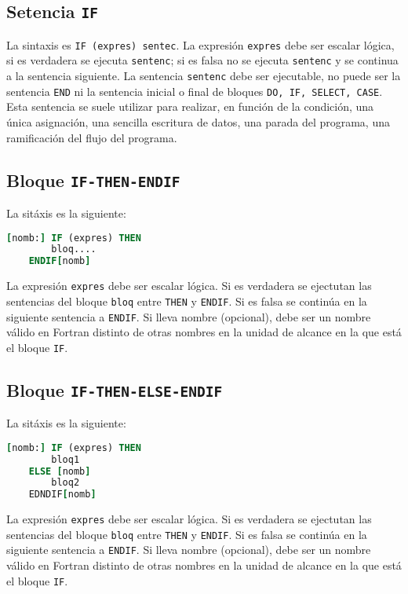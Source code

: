 \subsection{Setencia {\tt IF}}

La sintaxis es {\tt IF (expres) sentec}. La expresión {\tt expres} debe ser escalar lógica, si es verdadera se ejecuta {\tt sentenc}; si es falsa no se ejecuta {\tt sentenc} y se continua a la sentencia siguiente. La sentencia {\tt sentenc} debe ser ejecutable, no puede ser la sentencia {\tt END} ni la sentencia inicial o final de bloques {\tt DO, IF, SELECT, CASE}. \\

Esta sentencia se suele utilizar para realizar, en función de la condición, una única asignación, una sencilla escritura de datos, una parada del programa, una ramificación del flujo del programa.

\subsection{Bloque {\tt IF-THEN-ENDIF}}

La sitáxis es la siguiente:

\begin{lstlisting}[language=Fortran]
	[nomb:] IF (expres) THEN 
		bloq....
	ENDIF[nomb]
\end{lstlisting}

La expresión \texttt{expres} debe ser escalar lógica. Si es verdadera se ejectutan las sentencias del bloque \texttt{bloq} entre \texttt{THEN} y \texttt{ENDIF}. Si es falsa se continúa en la siguiente sentencia a \texttt{ENDIF}. Si lleva nombre (opcional), debe ser un nombre válido en Fortran distinto de otras nombres en la unidad de alcance en la que está el bloque \texttt{IF}.


\subsection{Bloque {\tt IF-THEN-ELSE-ENDIF}}
La sitáxis es la siguiente:

\begin{lstlisting}[language=Fortran]
	[nomb:] IF (expres) THEN 
		bloq1 
	ELSE [nomb] 
		bloq2 
	EDNDIF[nomb] 
\end{lstlisting}

La expresión \texttt{expres} debe ser escalar lógica. Si es verdadera se ejectutan las sentencias del bloque \texttt{bloq} entre \texttt{THEN} y \texttt{ENDIF}. Si es falsa se continúa en la siguiente sentencia a \texttt{ENDIF}. Si lleva nombre (opcional), debe ser un nombre válido en Fortran distinto de otras nombres en la unidad de alcance en la que está el bloque \texttt{IF}.


